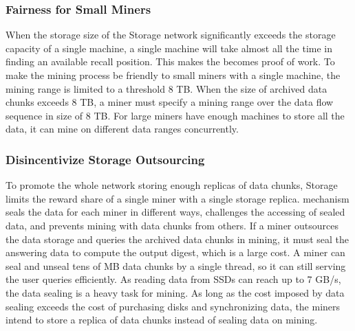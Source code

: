 
\subsubsection{Fairness for Small Miners}

When the storage size of the \projabbrev Storage network significantly exceeds the storage capacity of a single machine, a single machine will take almost all the time in finding an available recall position. 
%
This makes the {\sproof} becomes proof of work. 
%
To make the {\sproof} mining process be friendly to small miners with a single machine, the mining range is limited to a threshold 8 TB. 
%
When the size of archived data chunks exceeds 8 TB, a miner must specify a mining range over the data flow sequence in size of 8 TB.
%
For large miners have enough machines to store all the data, it can mine on different data ranges concurrently. 

\subsubsection{Disincentivize Storage Outsourcing}

To promote the whole network storing enough replicas of data chunks, \projabbrev Storage limits the reward share of a single miner with a single storage replica.
%
{\sproof} mechanism seals the data for each miner in different ways, challenges the accessing of sealed data, and prevents mining with data chunks from others. 
% 
If a miner outsources the data storage and queries the archived data chunks in {\sproof} mining, it must seal the answering data to compute the output digest, which is a large cost.
%
A miner can seal and unseal tens of MB data chunks by a single thread, so it can still serving the user queries efficiently. 
%
As reading data from SSDs can reach up to 7 GB/s, the data sealing is a heavy task for {\sproof} mining.
%
As long as the cost imposed by data sealing exceeds the cost of purchasing disks and synchronizing data, the miners intend to store a replica of data chunks instead of sealing data on {\sproof} mining.

